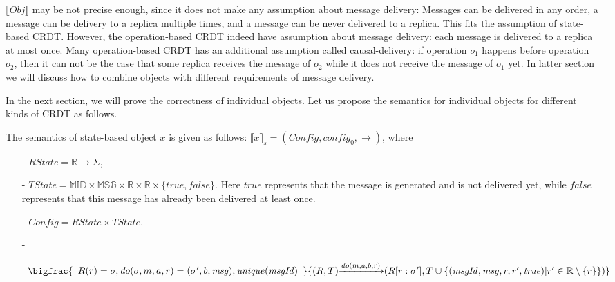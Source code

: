{$\llbracket \mathit{Obj} \rrbracket$ may be not precise enough, since it does not make any assumption about message delivery: Messages can be delivered in any order, a message can be delivery to a replica multiple times, and a message can be never delivered to a replica. This fits the assumption of state-based CRDT. However, the operation-based CRDT indeed have assumption about message delivery: each message is delivered to a replica at most once. Many operation-based CRDT has an additional assumption called causal-delivery: if operation $o_1$ happens before operation $o_2$, then it can not be the case that some replica receives the message of $o_2$ while it does not receive the message of $o_1$ yet. In latter section we will discuss how to combine objects with different requirements of message delivery.

In the next section, we will prove the correctness of individual objects. Let us propose the semantics for individual objects for different kinds of CRDT as follows.

The semantics of state-based object $x$ is given as follows: $\llbracket x \rrbracket_{s} = (\mathit{Config},\mathit{config}_0,\rightarrow)$, where

\begin{itemize}
\setlength{\itemsep}{0.5pt}
\item[-] $\mathit{RState} = \mathbb{R} \rightarrow \Sigma$,

\item[-] $\mathit{TState} = \mathbb{MID} \times \mathbb{MSG} \times \mathbb{R} \times \mathbb{R} \times \{ \mathit{true},\mathit{false} \}$. Here $\mathit{true}$ represents that the message is generated and is not delivered yet, while $\mathit{false}$ represents that this message has already been delivered at least once.


\item[-] $\mathit{Config} = \mathit{RState} \times \mathit{TState}$.

\item[-]

$\begin{array}{l c}
   \bigfrac{
   \begin{array}{c}
     R(r) = \sigma, \mathit{do}(\sigma,m,a,r) = (\sigma',b,\mathit{msg}), \mathit{unique}(\mathit{msgId})
   \end{array}}
     {(R,T) {\xrightarrow{\mathit{do}(m,a,b,r)}} (R[r:\sigma'],T \cup \{ (\mathit{msgId},\mathit{msg},r,r',\mathit{true}) \vert r' \in \mathbb{R} \setminus \{ r \} \})}
\end{array}$


\end{itemize}}
